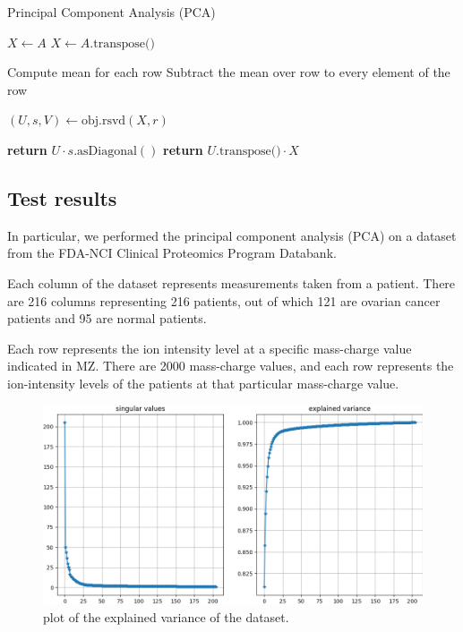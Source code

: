 \documentclass{article}
\begin{document}
\begin{algorithm}
\caption{Principal Component Analysis (PCA)}
\begin{algorithmic}[1]
    
        \State $X \gets A$
    \Else
        \State $X \gets A.\text{transpose()}$
    \EndIf

        \State Compute mean for each row
        \State Subtract the mean over row to every element of the row
    \EndFor

    \State $(U, s, V) \gets \text{obj.rsvd}(X, r)$

            \State \textbf{return} $U \cdot s.\text{asDiagonal}()$
    \Else {}
        \State \textbf{return} $U.\text{transpose()} \cdot X$
    \EndIf
\EndFunction
\end{algorithmic}
\end{algorithm}


\subsection{Test results}
In particular, we performed the principal component analysis (PCA) on a dataset from the FDA-NCI Clinical Proteomics Program Databank.

Each column of the dataset represents measurements taken from a patient. There are 216 columns representing 216 patients, out of which 121 are ovarian cancer patients and 95 are normal patients.

Each row represents the ion intensity level at a specific mass-charge value indicated in MZ. There are 2000 mass-charge values, and each row represents the ion-intensity levels of the patients at that particular mass-charge value.

\vspace{\baselineskip}
\begin{figure}[h]
\centering
\includegraphics[width=0.55\linewidth]{pca_explained_variance200.png}
\caption{\label{fig:pca1}plot of the explained variance of the dataset.}
\end{figure}
\end{document}
